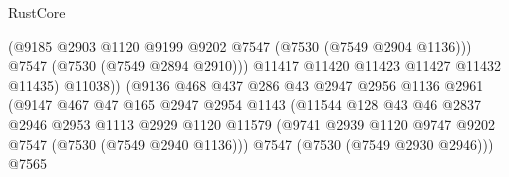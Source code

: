 \begin{lexlean}{RustCore}
\begin{coremodule}
                                            (@9185
                                              @2903
                                              @1120
                                              @9199
                                              @9202
                                              @7547
                                              (@7530 (@7549 @2904 @1136)))
                                            @7547
                                            (@7530 (@7549 @2894 @2910)))
                                          @11417
                                          @11420
                                          @11423
                                          @11427
                                          @11432
                                          @11435)
                                        @11038))
                                    (@9136
                                      @468
                                      @437
                                      @286
                                      @43
                                      @2947
                                      @2956
                                      @1136
                                      @2961
                                      (@9147
                                        @467
                                        @47
                                        @165
                                        @2947
                                        @2954
                                        @1143
                                        (@11544
                                          @128
                                          @43
                                          @46
                                          @2837
                                          @2946
                                          @2953
                                          @1113
                                          @2929
                                          @1120
                                          @11579
                                          (@9741
                                            @2939
                                            @1120
                                            @9747
                                            @9202
                                            @7547
                                            (@7530 (@7549 @2940 @1136)))
                                          @7547
                                          (@7530 (@7549 @2930 @2946)))
                                        @7565

\end{coremodule}
\end{lexlean}

